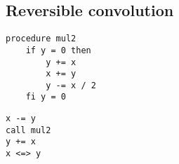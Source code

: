 

\subsection{Reversible convolution}


\begin{lstlisting}
procedure mul2
    if y = 0 then
        y += x
        x += y
        y -= x / 2
    fi y = 0
\end{lstlisting}


\begin{lstlisting}
x -= y
call mul2
y += x
x <=> y
\end{lstlisting}
